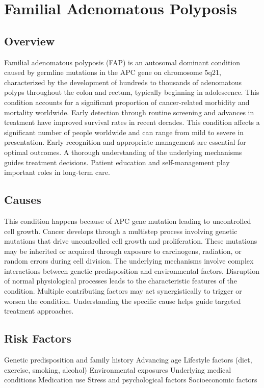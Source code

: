 \chapter{Familial Adenomatous Polyposis}
\label{sec:Familial Adenomatous Polyposis}

\section{Overview}
Familial adenomatous polyposis (FAP) is an autosomal dominant condition caused by germline mutations in the APC gene on chromosome 5q21, characterized by the development of hundreds to thousands of adenomatous polyps throughout the colon and rectum, typically beginning in adolescence. This condition accounts for a significant proportion of cancer-related morbidity and mortality worldwide. Early detection through routine screening and advances in treatment have improved survival rates in recent decades. This condition affects a significant number of people worldwide and can range from mild to severe in presentation. Early recognition and appropriate management are essential for optimal outcomes. A thorough understanding of the underlying mechanisms guides treatment decisions. Patient education and self-management play important roles in long-term care.
\section{Causes}
This condition happens because of APC gene mutation leading to uncontrolled cell growth. Cancer develops through a multistep process involving genetic mutations that drive uncontrolled cell growth and proliferation. These mutations may be inherited or acquired through exposure to carcinogens, radiation, or random errors during cell division. The underlying mechanisms involve complex interactions between genetic predisposition and environmental factors. Disruption of normal physiological processes leads to the characteristic features of the condition. Multiple contributing factors may act synergistically to trigger or worsen the condition. Understanding the specific cause helps guide targeted treatment approaches.
\section{Risk Factors}
Genetic predisposition and family history Advancing age Lifestyle factors (diet, exercise, smoking, alcohol) Environmental exposures Underlying medical conditions Medication use Stress and psychological factors Socioeconomic factors

